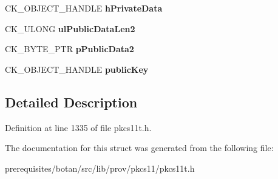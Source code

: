 \begin{DoxyCompactItemize}
\item 
\mbox{\label{struct_c_k___e_c_m_q_v___d_e_r_i_v_e___p_a_r_a_m_s_a9ba1429299801b8e12bf02367d8c0c55}} 
C\+K\+\_\+\+O\+B\+J\+E\+C\+T\+\_\+\+H\+A\+N\+D\+LE {\bfseries h\+Private\+Data}
\item 
\mbox{\label{struct_c_k___e_c_m_q_v___d_e_r_i_v_e___p_a_r_a_m_s_a433e51c98a2ad536c8a69706c04c6193}} 
C\+K\+\_\+\+U\+L\+O\+NG {\bfseries ul\+Public\+Data\+Len2}
\item 
\mbox{\label{struct_c_k___e_c_m_q_v___d_e_r_i_v_e___p_a_r_a_m_s_a0bd74ccfdd71d504ec8a24dc058c7b9d}} 
C\+K\+\_\+\+B\+Y\+T\+E\+\_\+\+P\+TR {\bfseries p\+Public\+Data2}
\item 
\mbox{\label{struct_c_k___e_c_m_q_v___d_e_r_i_v_e___p_a_r_a_m_s_a81e24515ecc90a3deb1995b7e8303d9c}} 
C\+K\+\_\+\+O\+B\+J\+E\+C\+T\+\_\+\+H\+A\+N\+D\+LE {\bfseries public\+Key}
\end{DoxyCompactItemize}


\subsection{Detailed Description}


Definition at line 1335 of file pkcs11t.\+h.



The documentation for this struct was generated from the following file\+:\begin{DoxyCompactItemize}
\item 
prerequisites/botan/src/lib/prov/pkcs11/pkcs11t.\+h\end{DoxyCompactItemize}
